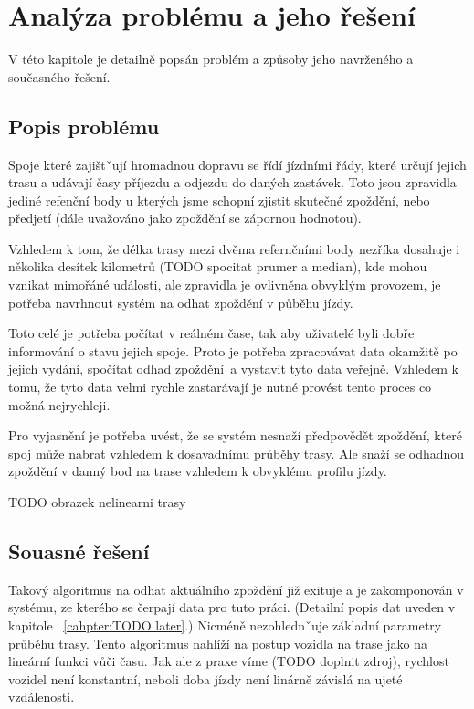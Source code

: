 
\chapter{Analýza problému a jeho řešení}

V této kapitole je detailně popsán problém a způsoby jeho navrženého a současného řešení.

\section{Popis problému}

Spoje které zajištˇují hromadnou dopravu se řídí jízdními řády, které určují jejich trasu a udávají časy příjezdu a odjezdu do daných zastávek. Toto jsou zpravidla jediné refenční body u kterých jsme schopní zjistit skutečné zpoždění, nebo předjetí (dále uvažováno jako zpoždění se zápornou hodnotou).

\bigbreak

Vzhledem k tom, že délka trasy mezi dvěma refernčními body nezříka dosahuje i několika desítek kilometrů (TODO spocitat prumer a median), kde mohou vznikat mimořáné události, ale zpravidla je ovlivněna obvyklým provozem, je potřeba navrhnout systém na odhat zpoždění v půběhu jízdy.

\bigbreak

Toto celé je potřeba počítat v reálném čase, tak aby uživatelé byli dobře informování o stavu jejich spoje. Proto je potřeba zpracovávat data okamžitě po jejich vydání, spočítat odhad zpoždění a vystavit tyto data veřejně. Vzhledem k tomu, že tyto data velmi rychle zastarávají je nutné provést tento proces co možná nejrychleji.

\bigbreak

Pro vyjasnění je potřeba uvést, že se systém nesnaží předpovědět zpoždění, které spoj může nabrat vzhledem k dosavadnímu průběhy trasy. Ale snaží se odhadnou zpoždění v danný bod na trase vzhledem k obvyklému profilu jízdy.

TODO obrazek nelinearni trasy

\section{Souasné řešení}

Takový algoritmus na odhat aktuálního zpoždění již exituje a je zakomponován v systému, ze kterého se čerpají data pro tuto práci. (Detailní popis dat uveden v kapitole ~\ref{cahpter:TODO later}.) Nicméně nezohlednˇuje základní parametry průběhu trasy. Tento algoritmus nahlíží na postup vozidla na trase jako na lineární funkci vůči času. Jak ale z praxe víme (TODO doplnit zdroj), rychlost vozidel není konstantní, neboli doba jízdy není linárně závislá na ujeté vzdálenosti.


